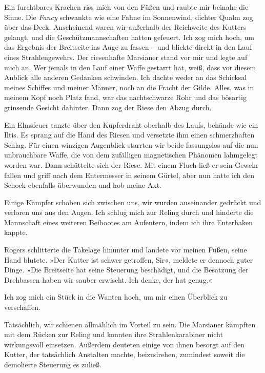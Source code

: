 Ein furchtbares Krachen riss mich von den Füßen und raubte mir
beinahe die Sinne. Die \emph{Fancy} schwankte wie eine Fahne im
Sonnenwind, dichter Qualm zog über das Deck. Anscheinend waren wir
außerhalb der Reichweite des Kutters gelangt, und die
Geschützmannschaften hatten gefeuert. Ich zog mich hoch, um das
Ergebnis der Breitseite ins Auge zu fassen – und blickte direkt in
den Lauf eines Strahlengewehrs. Der riesenhafte Marsianer stand vor
mir und legte auf mich an. Wer jemals in den Lauf einer Waffe
gestarrt hat, weiß, dass vor diesem Anblick alle anderen Gedanken
schwinden. Ich dachte weder an das Schicksal meines Schiffes und
meiner Männer, noch an die Fracht der Gilde. Alles, was in meinem
Kopf noch Platz fand, war das nachtschwarze Rohr und das bösartig
grinsende Gesicht dahinter. Dann zog der Riese den Abzug durch.

\bigpar

Ein Elmsfeuer tanzte über den Kupferdraht oberhalb des Laufs,
behände wie ein Iltis. Es sprang auf die Hand des Riesen und
versetzte ihm einen schmerzhaften Schlag. Für einen winzigen
Augenblick starrten wir beide fassungslos auf die nun unbrauchbare
Waffe, die von dem zufälligen magnetischen Phänomen lahmgelegt
worden war. Dann schüttelte sich der Riese. Mit einem Fluch ließ er
sein Gewehr fallen und griff nach dem Entermesser in seinem Gürtel,
aber nun hatte ich den Schock ebenfalls überwunden und hob meine
Axt.

Einige Kämpfer schoben sich zwischen uns, wir wurden auseinander
gedrückt und verloren uns aus den Augen. Ich schlug mich zur Reling
durch und hinderte die Mannschaft eines weiteren Beibootes am
Aufentern, indem ich ihre Enterhaken kappte.

Rogers schlitterte die Takelage hinunter und landete vor meinen
Füßen, seine Hand blutete. »Der Kutter ist schwer getroffen, Sir«,
meldete er dennoch guter Dinge. »Die Breitseite hat seine Steuerung
beschädigt, und die Besatzung der Drehbassen haben wir sauber
erwischt. Ich denke, der hat genug.«

Ich zog mich ein Stück in die Wanten hoch, um mir einen Überblick
zu verschaffen.

\bigpar

Tatsächlich, wir schienen allmählich im Vorteil zu sein. Die
Marsianer kämpften mit dem Rücken zur Reling und konnten ihre
Strahlenkarabiner nicht wirkungsvoll einsetzen. Außerdem deuteten
einige von ihnen besorgt auf den Kutter, der tatsächlich Anstalten
machte, beizudrehen, zumindest soweit die demolierte Steuerung es
zuließ.

